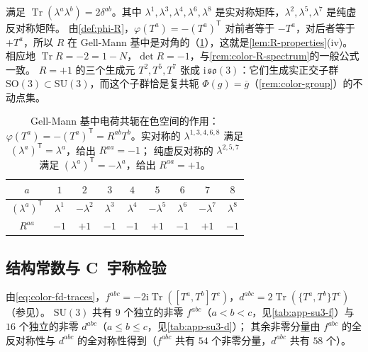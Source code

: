 \documentclass[UTF8,a4paper,11pt,fontset=fandol]{ctexart}
\theoremstyle{cplain}
\theoremstyle{cdefinition}
\theoremstyle{cremark}
\numberwithin{equation}{section}
\DeclareMathOperator{\Tr}{Tr}
\newcommand{\tp}{\mathsf{T}}                         %
\newcommand{\ii}{\mathrm{i}}                        %
\begin{document}
满足 $\Tr(\lambda^a\lambda^b)=2\delta^{ab}$。其中 $\lambda^{1},\lambda^{3},\lambda^{4},\lambda^{6},\lambda^{8}$ 是实对称矩阵，$\lambda^{2},\lambda^{5},\lambda^{7}$ 是纯虚反对称矩阵。
由\cref{def:phi-R}，$\varphi(T^a)=-(T^a)^{\tp}$ 对前者等于 $-T^a$，对后者等于 $+T^a$，所以 $R$ 在 Gell-Mann 基中是对角的（\cref{tab:app-su3-R}），这就是\cref{lem:R-properties}(iv)。
相应地 $\Tr R=-2=1-N$，$\det R=-1$，与\cref{rem:color-R-spectrum}的一般公式一致。
$R=+1$ 的三个生成元 $T^2,T^5,T^7$ 张成 $\ii\,\mathfrak{so}(3)$：它们生成实正交子群 $\mathrm{SO}(3)\subset\mathrm{SU}(3)$，而这个子群恰是复共轭 $\Phi(g)=\overline g$（\cref{rem:color-group}）的不动点集。

\begin{table}[htbp]
\centering
\caption{Gell-Mann 基中电荷共轭在色空间的作用：$\varphi(T^a)=-(T^a)^{\tp}=R^{ab}T^b$。实对称的 $\lambda^{1,3,4,6,8}$ 满足 $(\lambda^a)^{\tp}=\lambda^a$，给出 $R^{aa}=-1$；
纯虚反对称的 $\lambda^{2,5,7}$ 满足 $(\lambda^a)^{\tp}=-\lambda^a$，给出 $R^{aa}=+1$。}
\label{tab:app-su3-R}
\renewcommand{\arraystretch}{1.2}
\begin{tabular}{@{}c*{8}{c}@{}}
\toprule
$a$ & $1$ & $2$ & $3$ & $4$ & $5$ & $6$ & $7$ & $8$\\
\midrule
$(\lambda^a)^{\tp}$ & $\lambda^{1}$ & $-\lambda^{2}$ & $\lambda^{3}$ & $\lambda^{4}$ & $-\lambda^{5}$ & $\lambda^{6}$ & $-\lambda^{7}$ & $\lambda^{8}$\\
$R^{aa}$ & $-1$ & $+1$ & $-1$ & $-1$ & $+1$ & $-1$ & $+1$ & $-1$\\
\bottomrule
\end{tabular}
\end{table}

\subsection{结构常数与 C~宇称检验}\label{sec:app-su3-fd}

由\cref{eq:color-fd-traces}，$f^{abc}=-2\ii\Tr([T^a,T^b]T^c)$，$d^{abc}=2\Tr(\{T^a,T^b\}T^c)$（参见\cite{GellMann1962,MacfarlaneSudberyWeisz1968}）。
$\mathrm{SU}(3)$ 共有 $9$ 个独立的非零 $f^{abc}$（$a<b<c$，见\cref{tab:app-su3-f}）与 $16$ 个独立的非零 $d^{abc}$（$a\le b\le c$，见\cref{tab:app-su3-d}）；
其余非零分量由 $f^{abc}$ 的全反对称性与 $d^{abc}$ 的全对称性得到（$f^{abc}$ 共有 $54$ 个非零分量，$d^{abc}$ 共有 $58$ 个）。
\end{document}
